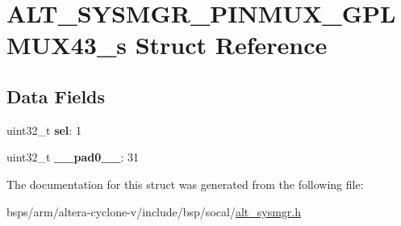 \hypertarget{structALT__SYSMGR__PINMUX__GPLMUX43__s}{}\section{A\+L\+T\+\_\+\+S\+Y\+S\+M\+G\+R\+\_\+\+P\+I\+N\+M\+U\+X\+\_\+\+G\+P\+L\+M\+U\+X43\+\_\+s Struct Reference}
\label{structALT__SYSMGR__PINMUX__GPLMUX43__s}
\subsection*{Data Fields}
\begin{DoxyCompactItemize}
\item 
\mbox{\label{structALT__SYSMGR__PINMUX__GPLMUX43__s_a03afd775f3229f89398ecae19ec6473b}} 
uint32\+\_\+t {\bfseries sel}\+: 1
\item 
\mbox{\label{structALT__SYSMGR__PINMUX__GPLMUX43__s_a395eac284e0b74e4064c590b56c9c81c}} 
uint32\+\_\+t {\bfseries \+\_\+\+\_\+pad0\+\_\+\+\_\+}\+: 31
\end{DoxyCompactItemize}


The documentation for this struct was generated from the following file\+:\begin{DoxyCompactItemize}
\item 
bsps/arm/altera-\/cyclone-\/v/include/bsp/socal/\mbox{\hyperlink{alt__sysmgr_8h}{alt\+\_\+sysmgr.\+h}}\end{DoxyCompactItemize}

